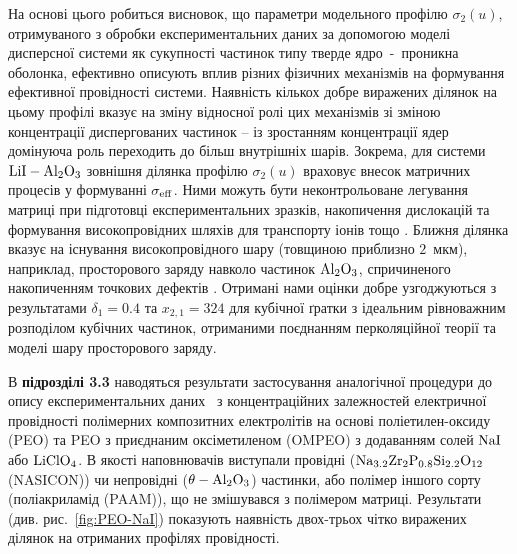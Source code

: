 \documentclass[twoside,a4paper,14pt]{vakaref-utf8}
\begin{document}
На основі цього робиться висновок, що  параметри модельного профілю $\sigma_2(u)$, отримуваного з обробки експериментальних даних за допомогою моделі дисперсної системи як сукупності частинок типу тверде ядро~-~проникна оболонка, ефективно описують вплив різних фізичних механізмів на формування ефективної провідності системи. Наявність кількох добре виражених ділянок на цьому профілі вказує на зміну відносної ролі цих механізмів зі зміною концентрації диспергованих частинок -- із зростанням концентрації ядер домінуюча роль переходить до більш внутрішніх шарів.
Зокрема, для системи $\rm LiI-Al_2O_3$ зовнішня ділянка профілю $\sigma_2(u)$ враховує внесок матричних процесів у формуванні $\sigma_{\rm eff}$. Ними можуть бути неконтрольоване легування матриці при підготовці експериментальних зразків, накопичення дислокацій та формування високопровідних шляхів для транспорту іонів тощо \cite{Dudney1989}. 
Ближня ділянка вказує на існування високопровідного шару (товщиною приблизно $2$~мкм), наприклад, просторового заряду навколо частинок $\rm Al_2O_3$, спричиненого накопиченням точкових дефектів \cite{Maier1985}. Отримані нами оцінки добре узгоджуються з результатами $\delta_1=0.4$ та $x_{2,1}=324$ \cite{Jiang1995b} для кубічної ґратки з ідеальним рівноважним розподілом кубічних частинок, отриманими поєднанням перколяційної теорії та моделі шару просторового заряду.

В {\bf підрозділі 3.3} наводяться результати застосування аналогічної процедури до опису експериментальних даних~\cite{Przl1995, Wiec1994} з концентраційних залежностей електричної провідності полімерних композитних електролітів на основі поліетилен-оксиду (PEO) та PEO з приєднаним оксіметиленом (OMPEO) з додаванням солей $\rm NaI$ або $\rm LiClO_4$. В якості наповнювачів виступали провідні ($\rm Na_{3.2}Zr_2P_{0.8}Si_{2.2}O_{12}$ (NASICON)) чи непровідні ($\rm \theta- Al_2O_3$) частинки, або полімер іншого сорту (поліакриламід (PAAM)), що не змішувався з полімером матриці. Результати (див. рис.~\ref{fig:PEO-NaI}) показують наявність двох-трьох чітко виражених ділянок на отриманих профілях провідності.
\end{document}
